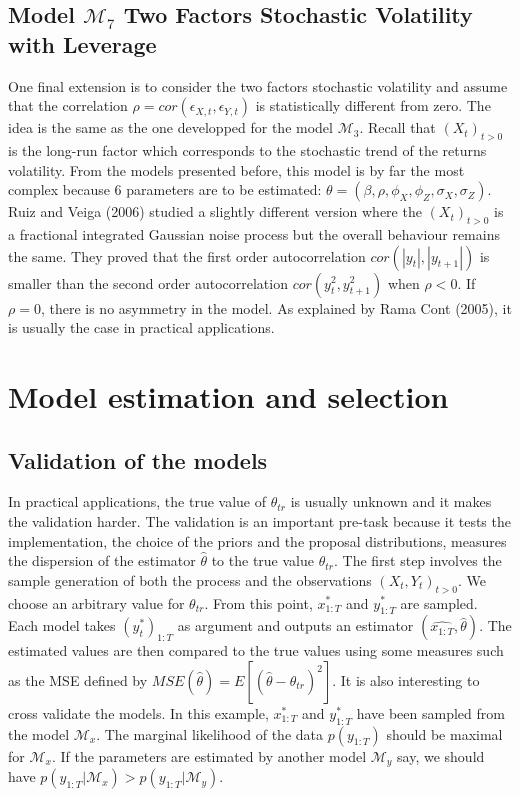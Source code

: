 \documentclass[11pt,a4,twosided,singlespacing,titlepagenumber=on]{scrreprt}
\numberwithin{equation}{chapter} %
\theoremstyle{remark}
\begin{document}
\section{Model $\mathcal{M}_7$ Two Factors Stochastic Volatility with Leverage}

One final extension is to consider the two factors stochastic volatility and assume that the correlation $\rho = cor(\epsilon_{X,t}, \epsilon_{Y,t})$ is statistically different from zero. The idea is the same as the one developped for the model $\mathcal{M}_3$. Recall that $(X_t)_{t>0}$ is the long-run factor which corresponds to the stochastic trend of the returns volatility. From the models presented before, this model is by far the most complex because 6 parameters are to be estimated: $\theta = (\beta, \rho, \phi_X, \phi_Z, \sigma_X, \sigma_Z)$. Ruiz and Veiga (2006) studied a slightly different version where the $(X_t)_{t>0}$ is a fractional integrated Gaussian noise process but the overall behaviour remains the same. They proved that the first order autocorrelation $cor(|y_t|,|y_{t+1}|)$ is smaller than the second order autocorrelation $cor(y_t^2,y_{t+1}^2)$ when $\rho < 0$. If $\rho = 0$, there is no asymmetry in the model. As explained by Rama Cont (2005), it is usually the case in practical applications.

\chapter{Model estimation and selection}

\section{Validation of the models}

\noindent
In practical applications, the true value of $\theta_{tr}$ is usually unknown and it makes the validation harder. The validation is an important pre-task because it tests the implementation, the choice of the priors and the proposal distributions, measures the dispersion of the estimator $\hat{\theta}$ to the true value $\theta_{tr}$. The first step involves the sample generation of both the process and the observations $(X_t, Y_t)_{t > 0}$. We choose an arbitrary value for $\theta_{tr}$. From this point, $x^*_{1:T}$ and $y^*_{1:T}$ are sampled. Each model takes $(y_t^*)_{1:T}$ as argument and outputs an estimator $(\hat{x_{1:T}}, \hat{\theta})$. The estimated values are then compared to the true values using some measures such as the MSE defined by $MSE(\hat{\theta}) = E[ ( \hat{\theta} - \theta_{tr} )^2 ]$. It is also interesting to cross validate the models. In this example, $x^*_{1:T}$ and $y^*_{1:T}$ have been sampled from the model $\mathcal{M}_x$. The marginal likelihood of the data $p(y_{1:T})$ should be maximal for $\mathcal{M}_x$. If the parameters are estimated by another model $\mathcal{M}_y$ say, we should have $p(y_{1:T} | \mathcal{M}_x) > p(y_{1:T} | \mathcal{M}_y)$.
\end{document}
